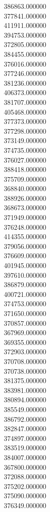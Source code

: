 386863.000000\\
377841.000000\\
411911.000000\\
394753.000000\\
372805.000000\\
384455.000000\\
376016.000000\\
377246.000000\\
381236.000000\\
406373.000000\\
381707.000000\\
405468.000000\\
377373.000000\\
377298.000000\\
373149.000000\\
374735.000000\\
376027.000000\\
388418.000000\\
375709.000000\\
368840.000000\\
388926.000000\\
368673.000000\\
371949.000000\\
376248.000000\\
414355.000000\\
379056.000000\\
376609.000000\\
401945.000000\\
397610.000000\\
386879.000000\\
400721.000000\\
374753.000000\\
371650.000000\\
370857.000000\\
367969.000000\\
369355.000000\\
372903.000000\\
370708.000000\\
370738.000000\\
381375.000000\\
383981.000000\\
380894.000000\\
385549.000000\\
386792.000000\\
382847.000000\\
374897.000000\\
383519.000000\\
384007.000000\\
367800.000000\\
372088.000000\\
375202.000000\\
375090.000000\\
376349.000000\\
